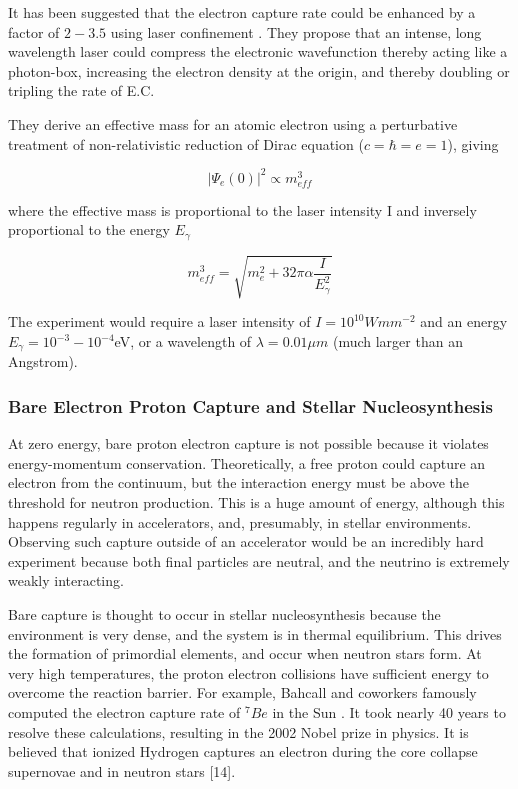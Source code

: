 \documentclass[%
 aip,
 jmp,%
 amsmath,amssymb,
 reprint,%
]{revtex4-1}
\begin{document}
It has been suggested that the electron capture rate could be enhanced by a factor of $2-3.5$ using laser confinement \cite{sato}.
They propose that an intense, long wavelength laser could compress the electronic wavefunction thereby acting like a photon-box,
increasing the electron density at the origin, and thereby doubling or tripling the rate of E.C.  

They derive an effective mass for an atomic electron using a perturbative treatment of non-relativistic reduction of Dirac equation ($c=\hbar=e=1$), giving

$$\big\vert\Psi_{e}(0)\big\vert^{2}\propto m_{eff}^{3}$$

where the effective mass is proportional to the laser intensity I and inversely proportional to the energy $E_{\gamma}$

$$m_{eff}^{3}=\sqrt{m_{e}^{2}+32\pi\alpha\dfrac{I}{E^{2}_{\gamma}}}$$

The experiment would require a laser intensity of $I=10^{10}Wmm^{-2}$ and an energy $E_{\gamma}=10^{-3}-10^{-4}$eV, or a wavelength of $\lambda=0.01\mu m$ (much larger than an Angstrom).  
  
\subsubsection{Bare Electron Proton Capture and Stellar Nucleosynthesis}

At zero energy, bare proton electron capture is not possible because it violates energy-momentum conservation. Theoretically, a free proton could capture an electron from the continuum, but the interaction energy must be above the threshold for neutron production.  This is a huge amount of energy, although this happens regularly in accelerators, and, presumably, in stellar environments.  Observing such capture outside of an accelerator would be an incredibly hard experiment  because both final particles are neutral, and the neutrino is extremely weakly interacting.  

Bare capture is thought to occur in stellar nucleosynthesis because the environment is very dense, and the system is in thermal equilibrium.  This drives the formation of primordial elements, and occur when neutron stars form.    At very high temperatures, the proton electron collisions have sufficient energy to overcome the reaction barrier.   For example, Bahcall and coworkers famously computed the electron capture rate of $^{7}Be$ in the Sun \cite{bahcall62,bahcall69}.  It took nearly 40 years to resolve these calculations, resulting in the 2002 Nobel prize in physics.  It is believed that ionized Hydrogen captures an electron during the core collapse supernovae and in neutron stars [14].   
\end{document}
